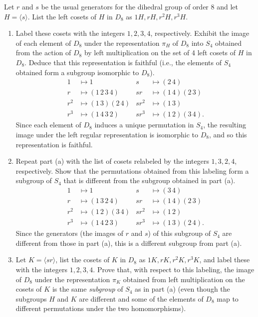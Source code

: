 \documentclass{article}
\begin{document}
Let $r$ and $s$ be the usual generators for the dihedral group of order 8 and let $H = \langle s \rangle$. List the left cosets of $H$ in $D_8$ as $1H, rH, r^2H, r^3H$.
\begin{enumerate}[label=(\alph*), itemsep=0em]
    \item Label these cosets with the integers $1, 2, 3, 4$, respectively. Exhibit the image of each element of $D_8$ under the representation $\pi_H$ of $D_8$ into $S_4$ obtained from the action of $D_8$ by left multiplication on the set of 4 left cosets of $H$ in $D_8$. Deduce that this representation is faithful (i.e., the elements of $S_4$ obtained form a subgroup isomorphic to $D_8$).
        \begin{align*}
            1 &\mapsto 1 & s &\mapsto (2\,4) \\
            r &\mapsto (1\,2\,3\,4) & sr &\mapsto (1\,4)(2\,3) \\
            r^2 &\mapsto (1\,3)(2\,4) & sr^2 &\mapsto (1\,3) \\
            r^3 &\mapsto (1\,4\,3\,2) & sr^3 &\mapsto (1\,2)(3\,4).
        \end{align*}
        Since each element of $D_8$ induces a unique permutation in $S_4$, the resulting image under the left regular representation is isomorphic to $D_8$, and so this representation is faithful.
    \item Repeat part (a) with the list of cosets relabeled by the integers $1, 3, 2, 4$, respectively. Show that the permutations obtained from this labeling form a subgroup of $S_4$ that is different from the subgroup obtained in part (a).
        \begin{align*}
            1 &\mapsto 1 & s &\mapsto (3\,4) \\
            r &\mapsto (1\,3\,2\,4) & sr &\mapsto (1\,4)(2\,3) \\
            r^2 &\mapsto (1\,2)(3\,4) & sr^2 &\mapsto (1\,2) \\
            r^3 &\mapsto (1\,4\,2\,3) & sr^3 &\mapsto (1\,3)(2\,4).
        \end{align*}
        Since the generators (the images of $r$ and $s$) of this subgroup of $S_4$ are different from those in part (a), this is a different subgroup from part (a).
    \item Let $K = \langle sr \rangle$, list the cosets of $K$ in $D_8$ as $1K, rK, r^2K, r^3K$, and label these with the integers $1, 2, 3, 4$. Prove that, with respect to this labeling, the image of $D_8$ under the representation $\pi_K$ obtained from left multiplication on the cosets of $K$ is the same \emph{subgroup} of $S_4$ as in part (a) (even though the subgroups $H$ and $K$ are different and some of the elements of $D_8$ map to different permutations under the two homomorphisms).

\end{enumerate}
\end{document}
